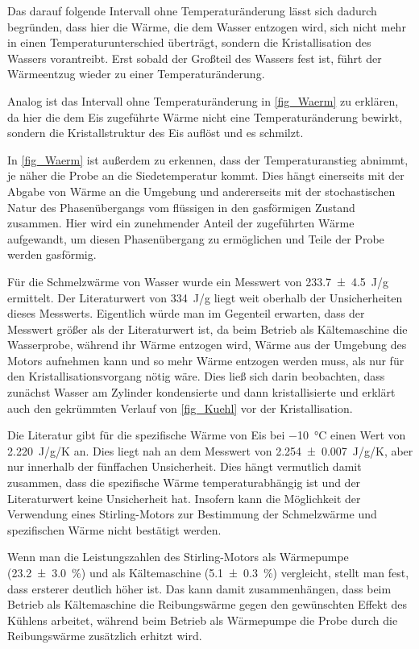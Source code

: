 \documentclass[
	a4paper,
	12pt,
	pagesize,
	ngerman
]{scrartcl}
\begin{document}
	Das darauf folgende Intervall ohne Temperaturänderung lässt sich dadurch begründen, dass hier die Wärme, die dem Wasser entzogen wird, sich nicht mehr in einen Temperaturunterschied überträgt, sondern die Kristallisation des Wassers vorantreibt.
	Erst sobald der Großteil des Wassers fest ist, führt der Wärmeentzug wieder zu einer Temperaturänderung.
	
	Analog ist das Intervall ohne Temperaturänderung in \cref{fig_Waerm} zu erklären, da hier die dem Eis zugeführte Wärme nicht eine Temperaturänderung bewirkt, sondern die Kristallstruktur des Eis auflöst und es schmilzt.
	
	In \cref{fig_Waerm} ist außerdem zu erkennen, dass der Temperaturanstieg abnimmt, je näher die Probe an die Siedetemperatur kommt.
	Dies hängt einerseits mit der Abgabe von Wärme an die Umgebung und andererseits mit der stochastischen Natur des Phasenübergangs vom flüssigen in den gasförmigen Zustand zusammen.
	Hier wird ein zunehmender Anteil der zugeführten Wärme aufgewandt, um diesen Phasenübergang zu ermöglichen und Teile der Probe werden gasförmig.
	
	Für die Schmelzwärme von Wasser wurde ein Messwert von \SI{233,7\pm 4,5}{J/g} ermittelt.
	Der Literaturwert \cite{schmelzWarm} von \SI{334}{J/g} liegt weit oberhalb der Unsicherheiten dieses Messwerts.
	Eigentlich würde man im Gegenteil erwarten, dass der Messwert größer als der Literaturwert ist, da beim Betrieb als Kältemaschine die Wasserprobe, während ihr Wärme entzogen wird, Wärme aus der Umgebung des Motors aufnehmen kann und so mehr Wärme entzogen werden muss, als nur für den Kristallisationsvorgang nötig wäre. 
	Dies ließ sich darin beobachten, dass zunächst Wasser am Zylinder kondensierte und dann kristallisierte und erklärt auch den gekrümmten Verlauf von \cref{fig_Kuehl} vor der Kristallisation.	
	
	Die Literatur \cite{spezWarm} gibt für die spezifische Wärme von Eis bei \SI{-10}{\degreeCelsius} einen Wert von \SI{2,220}{J/g/K} an.
	Dies liegt nah an dem Messwert von \SI{2,254\pm 0,007}{J/g/K}, aber nur innerhalb der fünffachen Unsicherheit.
	Dies hängt vermutlich damit zusammen, dass die spezifische Wärme temperaturabhängig ist und der Literaturwert keine Unsicherheit hat.
	Insofern kann die Möglichkeit der Verwendung eines Stirling-Motors zur Bestimmung der Schmelzwärme und spezifischen Wärme nicht bestätigt werden.
	
	Wenn man die Leistungszahlen des Stirling-Motors als Wärmepumpe (\SI{23,2+-3,0}{\%}) und als Kältemaschine (\SI{5,1 +- 0,3}{\%}) vergleicht, stellt man fest, dass ersterer deutlich höher ist.
	Das kann damit zusammenhängen, dass beim Betrieb als Kältemaschine die Reibungswärme gegen den gewünschten Effekt des Kühlens arbeitet, während beim Betrieb als Wärmepumpe die Probe durch die Reibungswärme zusätzlich erhitzt wird.
	
\end{document}
